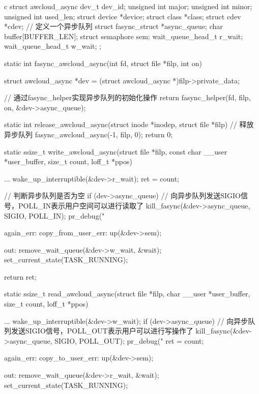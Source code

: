 \begin{code-block}{c}
struct awcloud_async {
        dev_t                dev_id;
        unsigned int         major;
        unsigned int         minor;
        unsigned int         used_len;
        struct device        *device;
        struct class         *class;
        struct cdev          *cdev;
        // 定义一个异步队列
        struct fasync_struct *async_queue;
        char                 buffer[BUFFER_LEN];
        struct semaphore     sem;
        wait_queue_head_t    r_wait;
        wait_queue_head_t    w_wait;
};

static int fasync_awcloud_async(int fd, struct file *filp, int on)
{
        struct awcloud_async *dev = (struct awcloud_async *)filp->private_data;

        // 通过fasync_helper实现异步队列的初始化操作
        return fasync_helper(fd, filp, on, &dev->async_queue);
}

static int release_awcloud_async(struct inode *inodep, struct file *filp)
{
        // 释放异步队列
        fasync_awcloud_async(-1, filp, 0);
        return 0;
}

static ssize_t write_awcloud_async(struct file *filp,
        const char __user *user_buffer, size_t count, loff_t *ppos)
{
        ...
        wake_up_interruptible(&dev->r_wait);
        ret = count;

        // 判断异步队列是否为空
        if (dev->async_queue) {
                // 向异步队列发送SIGIO信号，POLL_IN表示用户空间可以进行读取了
                kill_fasync(&dev->async_queue, SIGIO, POLL_IN);
                pr_debug("%
        }

again_err:
copy_from_user_err:
        up(&dev->sem);

out:
        remove_wait_queue(&dev->w_wait, &wait);
        set_current_state(TASK_RUNNING);

        return ret;
}

static ssize_t read_awcloud_async(struct file *filp,
        char __user *user_buffer, size_t count, loff_t *ppos)
{
        ...
        wake_up_interruptible(&dev->w_wait);
        if (dev->async_queue) {
                // 向异步队列发送SIGIO信号，POLL_OUT表示用户可以进行写操作了
                kill_fasync(&dev->async_queue, SIGIO, POLL_OUT);
                pr_debug("%
        }
        ret = count;

again_err:
copy_to_user_err:
        up(&dev->sem);

out:
        remove_wait_queue(&dev->r_wait, &wait);
        set_current_state(TASK_RUNNING);

}
\end{code-block}
